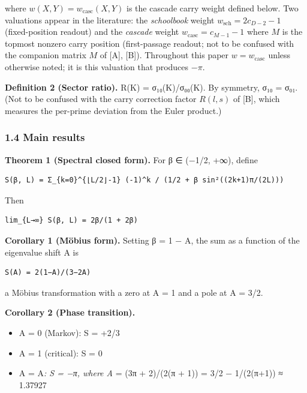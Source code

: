 \documentclass[
  11pt,
]{article}
\providecommand{\tightlist}{%
  \setlength{\itemsep}{0pt}\setlength{\parskip}{0pt}}
\begin{document}
where \(w(X,Y) = w_{\mathrm{casc}}(X,Y)\) is the cascade carry weight defined
below. Two valuations appear in the literature: the \emph{schoolbook} weight
\(w_{\mathrm{sch}} = 2c_{D-2} - 1\) (fixed-position readout) and the
\emph{cascade} weight \(w_{\mathrm{casc}} = c_{M-1} - 1\) where \(M\) is the
topmost nonzero carry position (first-passage readout; not to be confused with
the companion matrix \(M\) of {[}A{]}, {[}B{]}). Throughout this paper
\(w = w_{\mathrm{casc}}\) unless otherwise noted; it is this valuation that
produces \(-\pi\).

\textbf{Definition 2 (Sector ratio).} R(K) = σ₁₀(K)/σ₀₀(K). By symmetry, σ₁₀ =
σ₀₁. (Not to be confused with the carry correction factor \(R(l,s)\) of {[}B{]},
which measures the per-prime deviation from the Euler product.)

\subsubsection{1.4 Main results}\label{main-results}

\textbf{Theorem 1 (Spectral closed form).} For β ∈ (−1/2, +∞), define

\begin{verbatim}
S(β, L) = Σ_{k=0}^{⌊L/2⌋-1} (-1)^k / (1/2 + β sin²((2k+1)π/(2L)))
\end{verbatim}

Then

\begin{verbatim}
lim_{L→∞} S(β, L) = 2β/(1 + 2β)
\end{verbatim}

\textbf{Corollary 1 (Möbius form).} Setting β = 1 − A, the sum as a function of
the eigenvalue shift A is

\begin{verbatim}
S(A) = 2(1−A)/(3−2A)
\end{verbatim}

a Möbius transformation with a zero at A = 1 and a pole at A = 3/2.

\textbf{Corollary 2 (Phase transition).}

\begin{itemize}
\tightlist
\item
  A = 0 (Markov): S = +2/3
\item
  A = 1 (critical): S = 0
\item
  A = A\emph{: S = −π, where A} = (3π + 2)/(2(π + 1)) = 3/2 − 1/(2(π+1)) ≈
  1.37927
\end{itemize}
\end{document}
